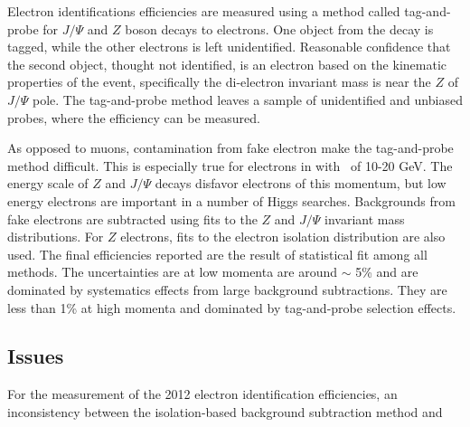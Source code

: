 Electron identifications efficiencies are measured using a method called tag-and-probe for $J/\Psi$ and $Z$ boson decays to electrons. One object from the decay is tagged, while the other electrons is left unidentified. Reasonable confidence that the second object, thought not identified, is an electron based on the kinematic properties of the event, specifically the di-electron invariant mass is near the $Z$ of $J/\Psi$ pole. The tag-and-probe method leaves a sample of unidentified and unbiased probes, where the efficiency can be measured.

As opposed to muons, contamination from fake electron make the tag-and-probe method difficult. This is especially true for electrons in with \pt\ of 10-20 GeV. The energy scale of $Z$ and $J/\Psi$ decays disfavor electrons of this momentum, but low energy electrons are important in a number of Higgs searches. Backgrounds from fake electrons are subtracted using fits to the $Z$ and $J/\Psi$ invariant mass distributions. For $Z$ electrons, fits to the electron isolation distribution are also used. The final efficiencies reported are the result of statistical fit among all methods. The uncertainties are at low momenta are around $\sim$ 5\% and are dominated by systematics effects from large background subtractions. They are less than 1\% at high momenta and dominated by tag-and-probe selection effects.

\subsection{Issues}

For the measurement of the 2012 electron identification efficiencies, an inconsistency between the isolation-based background subtraction method and   
